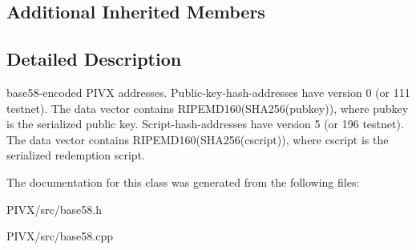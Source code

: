 \subsection*{Additional Inherited Members}


\subsection{Detailed Description}
base58-\/encoded P\+I\+VX addresses. Public-\/key-\/hash-\/addresses have version 0 (or 111 testnet). The data vector contains R\+I\+P\+E\+M\+D160(\+S\+H\+A256(pubkey)), where pubkey is the serialized public key. Script-\/hash-\/addresses have version 5 (or 196 testnet). The data vector contains R\+I\+P\+E\+M\+D160(\+S\+H\+A256(cscript)), where cscript is the serialized redemption script. 

The documentation for this class was generated from the following files\+:\begin{DoxyCompactItemize}
\item 
P\+I\+V\+X/src/base58.\+h\item 
P\+I\+V\+X/src/base58.\+cpp\end{DoxyCompactItemize}
